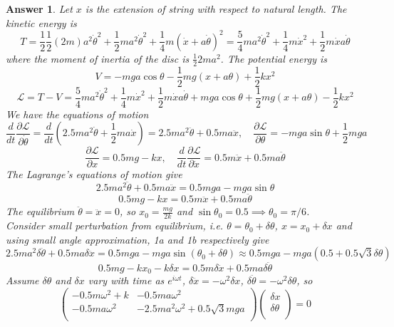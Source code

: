 \documentclass[a4paper]{article}
\newtheorem{ans}{Answer}[subsection]
\theoremstyle{new}
\begin{document}
\begin{ans}
Let $x$ is the extension of string with respect to natural length. The kinetic energy is
$$T=\frac{1}{2}\frac{1}{2}(2m)a^2\dot{\theta}^2+\frac{1}{2}ma^2\dot{\theta}^2+\frac{1}{4}m(\dot{x}+a\dot{\theta})^2=\frac{5}{4}ma^2\dot{\theta}^2+\frac{1}{4}m\dot{x}^2+\frac{1}{2}m\dot{x}a\dot{\theta}$$
where the moment of inertia of the disc is $\frac{1}{2}2ma^2$. The potential energy is
$$V=-mga\cos\theta-\frac{1}{2}mg(x+a\theta)+\frac{1}{2}kx^2$$
$$\mathcal{L}=T-V=\frac{5}{4}ma^2\dot{\theta}^2+\frac{1}{4}m\dot{x}^2+\frac{1}{2}m\dot{x}a\dot{\theta}+mga\cos\theta+\frac{1}{2}mg(x+a\theta)-\frac{1}{2}kx^2$$
We have the equations of motion
$$\frac{d}{dt}\frac{\partial\mathcal{L}}{\partial\dot{\theta}}=\frac{d}{dt}(2.5ma^2\dot{\theta}+\frac{1}{2}ma\dot{x})=2.5ma^2\ddot{\theta}+0.5ma\ddot{x},\quad\frac{\partial\mathcal{L}}{\partial\theta}=-mga\sin\theta+\frac{1}{2}mga$$
$$\frac{\partial\mathcal{L}}{\partial x}=0.5mg-kx,\quad\frac{d}{dt}\frac{\partial\mathcal{L}}{\partial\dot{x}}=0.5m\ddot{x}+0.5ma\ddot{\theta}$$
The Lagrange's equations of motion give
\begin{equation}
2.5ma^2\ddot{\theta}+0.5ma\ddot{x}=0.5mga-mga\sin\theta\tag{1a}
\end{equation}
\begin{equation}
0.5mg-kx=0.5m\ddot{x}+0.5ma\ddot{\theta}\tag{1b}
\end{equation}
The equilibrium $\ddot{\theta}=\ddot{x}=0$, so $x_0=\frac{mg}{2k}$ and $\sin\theta_0=0.5\implies\theta_0=\pi/6$.\\[5pt]
Consider small perturbation from equilibrium, i.e. $\theta=\theta_0+\delta\theta$, $x=x_0+\delta x$ and using small angle approximation, 1a and 1b respectively give
$$2.5ma^2\delta\ddot{\theta}+0.5ma\delta\ddot{x}=0.5mga-mga\sin(\theta_0+\delta\theta)\approx0.5mga-mga(0.5+0.5\sqrt{3}\delta\theta)$$
$$0.5mg-kx_0-k\delta x=0.5m\delta\ddot{x}+0.5ma\delta\ddot{\theta}$$
Assume $\delta\theta$ and $\delta x$ vary with time as $e^{i\omega t}$, $\delta\ddot{x}=-\omega^2\delta x$, $\delta\ddot{\theta}=-\omega^2\delta\theta$, so
$$\begin{pmatrix}-0.5m\omega^2+k&-0.5ma\omega^2\\-0.5ma\omega^2&-2.5ma^2\omega^2+0.5\sqrt{3}mga\\\end{pmatrix}\begin{pmatrix}\delta x\\\delta\theta\\\end{pmatrix}=0$$

\end{ans}
\end{document}
